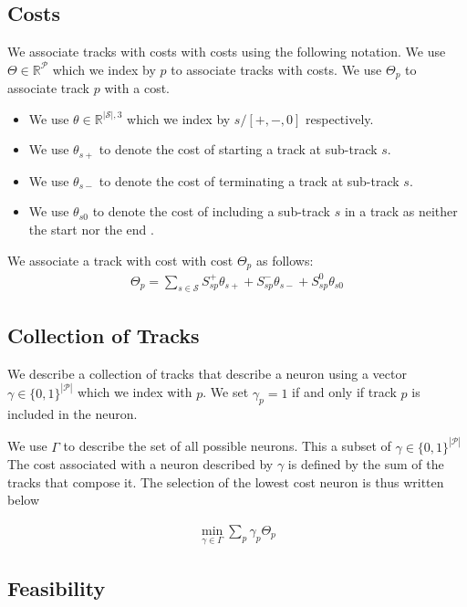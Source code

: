 \documentclass{article}
\begin{document}
\subsection{Costs }
We associate tracks with costs with costs using the following notation.  We use $\Theta \in \mathbb{R}^{\mathcal{P}}$ which we index by $p$ to associate  tracks  with costs.  We use $\Theta_p$ to associate track $p$ with a cost.  
\begin{itemize}
\item We use $\theta \in \mathbb{R}^{|\mathcal{S}|,3}$ which we index by $s/ [+,-,0]$ respectively.  
\item 
We use $\theta_{s+}$ to denote the cost of starting a track at sub-track $s$.  
\item 
We use $\theta_{s-}$ to denote the cost of terminating a track at sub-track $s$. 
\item 
We use $\theta_{s0}$ to denote the cost of including  a sub-track $s$ in a track as neither the start nor the end  . 
 \end{itemize}
 
 We associate a track with cost with cost $\Theta_p$ as follows:
 \begin{align}\label{cost_track}
 \Theta_p=\sum_{s \in \mathcal{S}}S^+_{sp}\theta_{s+}+S^-_{sp}\theta_{s-}+S^0_{sp}\theta_{s0}
 \end{align}
 
 \subsection{Collection of Tracks}
 
 We describe a collection of tracks that describe a neuron using a vector $\gamma \in \{ 0,1\}^{|\mathcal{P}|}$ which we index with $p$.  We set $\gamma_p=1$ if and only if track $p$ is included in the neuron.  
 
 We use $\Gamma$ to describe the set of all possible neurons.  This a subset of $\gamma \in \{ 0,1\}^{|\mathcal{P}|}$ The cost associated with a neuron described by $\gamma$ is defined by the sum of the tracks that compose it.  The selection of the lowest cost neuron is thus written below   
 
 \begin{align}\label{cost_neuron}
 \min_{\gamma \in \Gamma}\sum_p \gamma_p\Theta_p
 \end{align}
 
 \subsection{Feasibility}
\end{document}
